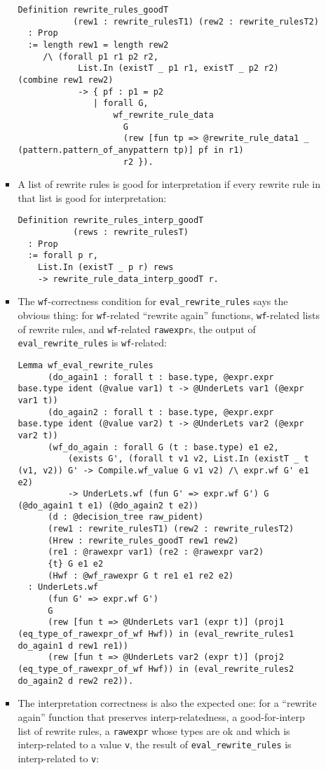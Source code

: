 \begin{itemize}
\begin{itemize}
\begin{itemize}
\begin{verbatim}
Definition rewrite_rules_goodT
           (rew1 : rewrite_rulesT1) (rew2 : rewrite_rulesT2)
  : Prop
  := length rew1 = length rew2
     /\ (forall p1 r1 p2 r2,
            List.In (existT _ p1 r1, existT _ p2 r2) (combine rew1 rew2)
            -> { pf : p1 = p2
               | forall G,
                   wf_rewrite_rule_data
                     G
                     (rew [fun tp => @rewrite_rule_data1 _ (pattern.pattern_of_anypattern tp)] pf in r1)
                     r2 }).
\end{verbatim}
    \item
      A list of rewrite rules is good for interpretation if every
      rewrite rule in that list is good for interpretation:

\begin{verbatim}
Definition rewrite_rules_interp_goodT
           (rews : rewrite_rulesT)
  : Prop
  := forall p r,
    List.In (existT _ p r) rews
    -> rewrite_rule_data_interp_goodT r.
\end{verbatim}
    \item
      The \texttt{wf}-correctness condition for
      \texttt{eval\_rewrite\_rules} says the obvious thing: for
      \texttt{wf}-related ``rewrite again'' functions,
      \texttt{wf}-related lists of rewrite rules, and
      \texttt{wf}-related \texttt{rawexpr}s, the output of
      \texttt{eval\_rewrite\_rules} is \texttt{wf}-related:

\begin{verbatim}
Lemma wf_eval_rewrite_rules
      (do_again1 : forall t : base.type, @expr.expr base.type ident (@value var1) t -> @UnderLets var1 (@expr var1 t))
      (do_again2 : forall t : base.type, @expr.expr base.type ident (@value var2) t -> @UnderLets var2 (@expr var2 t))
      (wf_do_again : forall G (t : base.type) e1 e2,
          (exists G', (forall t v1 v2, List.In (existT _ t (v1, v2)) G' -> Compile.wf_value G v1 v2) /\ expr.wf G' e1 e2)
          -> UnderLets.wf (fun G' => expr.wf G') G (@do_again1 t e1) (@do_again2 t e2))
      (d : @decision_tree raw_pident)
      (rew1 : rewrite_rulesT1) (rew2 : rewrite_rulesT2)
      (Hrew : rewrite_rules_goodT rew1 rew2)
      (re1 : @rawexpr var1) (re2 : @rawexpr var2)
      {t} G e1 e2
      (Hwf : @wf_rawexpr G t re1 e1 re2 e2)
  : UnderLets.wf
      (fun G' => expr.wf G')
      G
      (rew [fun t => @UnderLets var1 (expr t)] (proj1 (eq_type_of_rawexpr_of_wf Hwf)) in (eval_rewrite_rules1 do_again1 d rew1 re1))
      (rew [fun t => @UnderLets var2 (expr t)] (proj2 (eq_type_of_rawexpr_of_wf Hwf)) in (eval_rewrite_rules2 do_again2 d rew2 re2)).
\end{verbatim}
    \item
      The interpretation correctness is also the expected one: for a
      ``rewrite again'' function that preserves interp-relatedness, a
      good-for-interp list of rewrite rules, a \texttt{rawexpr} whose
      types are ok and which is interp-related to a value \texttt{v},
      the result of \texttt{eval\_rewrite\_rules} is interp-related to
      \texttt{v}:


\end{itemize}
\end{itemize}
\end{itemize}
